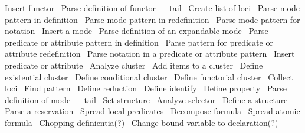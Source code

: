 \LA{}Insert functor~{\nwtagstyle{}}\RA{}
\LA{}Parse definition of functor --- tail~{\nwtagstyle{}}\RA{}
\LA{}Create list of loci~{\nwtagstyle{}}\RA{}
\LA{}Parse mode pattern in definition~{\nwtagstyle{}}\RA{}
\LA{}Parse mode pattern in redefinition~{\nwtagstyle{}}\RA{}
\LA{}Parse mode pattern for notation~{\nwtagstyle{}}\RA{}
\LA{}Insert a mode~{\nwtagstyle{}}\RA{}
\LA{}Parse definition of an expandable mode~{\nwtagstyle{}}\RA{}
\LA{}Parse predicate or attribute pattern in definition~{\nwtagstyle{}}\RA{}
\LA{}Parse pattern for predicate or attribute redefinition~{\nwtagstyle{}}\RA{}
\LA{}Parse notation in a predicate or attribute pattern~{\nwtagstyle{}}\RA{}
\LA{}Insert predicate or attribute~{\nwtagstyle{}}\RA{}
\LA{}Analyze cluster~{\nwtagstyle{}}\RA{}
\LA{}Add items to a cluster~{\nwtagstyle{}}\RA{}
\LA{}Define existential cluster~{\nwtagstyle{}}\RA{}
\LA{}Define conditional cluster~{\nwtagstyle{}}\RA{}
\LA{}Define functorial cluster~{\nwtagstyle{}}\RA{}
\LA{}Collect loci~{\nwtagstyle{}}\RA{}
\LA{}Find pattern~{\nwtagstyle{}}\RA{}
\LA{}Define reduction~{\nwtagstyle{}}\RA{}
\LA{}Define identify~{\nwtagstyle{}}\RA{}
\LA{}Define property~{\nwtagstyle{}}\RA{}
\LA{}Parse definition of mode --- tail~{\nwtagstyle{}}\RA{}
\LA{}Set structure~{\nwtagstyle{}}\RA{}
\LA{}Analyze selector~{\nwtagstyle{}}\RA{}
\LA{}Define a structure~{\nwtagstyle{}}\RA{}
\LA{}Parse a reservation~{\nwtagstyle{}}\RA{}
\LA{}Spread local predicates~{\nwtagstyle{}}\RA{}
\LA{}Decompose formula~{\nwtagstyle{}}\RA{}
\LA{}Spread atomic formula~{\nwtagstyle{}}\RA{}
\LA{}Chopping definientia(?)~{\nwtagstyle{}}\RA{}
\LA{}Change bound variable to declaration(?)~{\nwtagstyle{}}\RA{}
